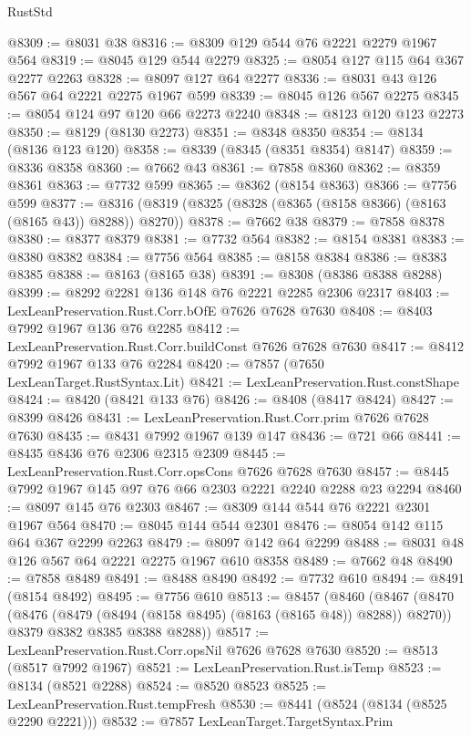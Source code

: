 \begin{lexlean}{RustStd}
\begin{coremodule}
{\begin{coremodule}
{{{{{{{{{{{{{{{{{{{{{{{{{{{{{{{{{{{{{{{{{{{{{{{{{{{{{@8309 := @8031 @38
@8316 := @8309 @129 @544 @76 @2221 @2279 @1967 @564
@8319 := @8045 @129 @544 @2279
@8325 := @8054 @127 @115 @64 @367 @2277 @2263
@8328 := @8097 @127 @64 @2277
@8336 := @8031 @43 @126 @567 @64 @2221 @2275 @1967 @599
@8339 := @8045 @126 @567 @2275
@8345 := @8054 @124 @97 @120 @66 @2273 @2240
@8348 := @8123 @120 @123 @2273
@8350 := @8129 (@8130 @2273)
@8351 := @8348 @8350
@8354 := @8134 (@8136 @123 @120)
@8358 := @8339 (@8345 (@8351 @8354) @8147)
@8359 := @8336 @8358
@8360 := @7662 @43
@8361 := @7858 @8360
@8362 := @8359 @8361
@8363 := @7732 @599
@8365 := @8362 (@8154 @8363)
@8366 := @7756 @599
@8377 := @8316 (@8319 (@8325 (@8328 (@8365 (@8158 @8366) (@8163 (@8165 @43)) @8288)) @8270))
@8378 := @7662 @38
@8379 := @7858 @8378
@8380 := @8377 @8379
@8381 := @7732 @564
@8382 := @8154 @8381
@8383 := @8380 @8382
@8384 := @7756 @564
@8385 := @8158 @8384
@8386 := @8383 @8385
@8388 := @8163 (@8165 @38)
@8391 := @8308 (@8386 @8388 @8288)
@8399 := @8292 @2281 @136 @148 @76 @2221 @2285 @2306 @2317
@8403 := LexLeanPreservation.Rust.Corr.bOfE @7626 @7628 @7630
@8408 := @8403 @7992 @1967 @136 @76 @2285
@8412 := LexLeanPreservation.Rust.Corr.buildConst @7626 @7628 @7630
@8417 := @8412 @7992 @1967 @133 @76 @2284
@8420 := @7857 (@7650 LexLeanTarget.RustSyntax.Lit)
@8421 := LexLeanPreservation.Rust.constShape
@8424 := @8420 (@8421 @133 @76)
@8426 := @8408 (@8417 @8424)
@8427 := @8399 @8426
@8431 := LexLeanPreservation.Rust.Corr.prim @7626 @7628 @7630
@8435 := @8431 @7992 @1967 @139 @147
@8436 := @721 @66
@8441 := @8435 @8436 @76 @2306 @2315 @2309
@8445 := LexLeanPreservation.Rust.Corr.opsCons @7626 @7628 @7630
@8457 := @8445 @7992 @1967 @145 @97 @76 @66 @2303 @2221 @2240 @2288 @23 @2294
@8460 := @8097 @145 @76 @2303
@8467 := @8309 @144 @544 @76 @2221 @2301 @1967 @564
@8470 := @8045 @144 @544 @2301
@8476 := @8054 @142 @115 @64 @367 @2299 @2263
@8479 := @8097 @142 @64 @2299
@8488 := @8031 @48 @126 @567 @64 @2221 @2275 @1967 @610 @8358
@8489 := @7662 @48
@8490 := @7858 @8489
@8491 := @8488 @8490
@8492 := @7732 @610
@8494 := @8491 (@8154 @8492)
@8495 := @7756 @610
@8513 := @8457
    (@8460
      (@8467
        (@8470 (@8476 (@8479 (@8494 (@8158 @8495) (@8163 (@8165 @48)) @8288)) @8270))
        @8379
        @8382
        @8385
        @8388
        @8288))
@8517 := LexLeanPreservation.Rust.Corr.opsNil @7626 @7628 @7630
@8520 := @8513 (@8517 @7992 @1967)
@8521 := LexLeanPreservation.Rust.isTemp
@8523 := @8134 (@8521 @2288)
@8524 := @8520 @8523
@8525 := LexLeanPreservation.Rust.tempFresh
@8530 := @8441 (@8524 (@8134 (@8525 @2290 @2221)))
@8532 := @7857 LexLeanTarget.TargetSyntax.Prim
}}}}}}}}}}}}}}}}}}}}}}}}}}}}}}}}}}}}}}}}}}}}}}}}}}}}}
\end{coremodule}}
\end{coremodule}
\end{lexlean}

